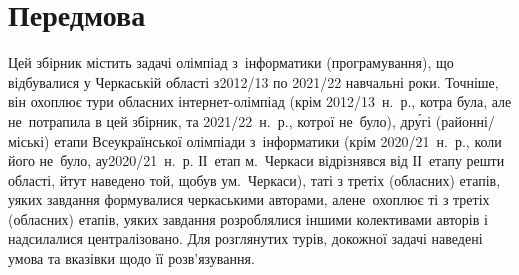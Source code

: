 \section{Передмова}

\hspace*{\parindent}Цей збірник містить задачі олімпіад з~інформатики (програмування), що відбувалися у Черкаській області з\nolinebreak[2] \mbox{2012/13} по \mbox{2021/22} навчальні роки. Точніше, він охоплює тури обласних інтернет-олімпіад (крім 2012/13~н.~р., котра була, але не~потрапила в цей збірник, та 2021/22~н.~р., котрої не~було), др\'{у}гі (районні/\linebreak[1]міські) етапи Всеукраїнської олімпіади з~інформатики (крім 2020/21~н.~р., коли його не~було, а\nolinebreak[2] у\nolinebreak[2] \mbox{2020/21}~н.~р. ІІ~етап м.~Черкаси відрізнявся від ІІ~етапу решти області, й\nolinebreak[3] тут наведено той, що\nolinebreak[2] був у\nolinebreak[3] м.~Черкаси), та\nolinebreak[2] ті з третіх (обласних) етапів, у\nolinebreak[3] яких завдання формувалися черкаськими авторами, але\nolinebreak[2] не~охоплює ті з третіх (обласних) етапів, у\nolinebreak[3] яких завдання розроблялися іншими колективами авторів і надсилалися централізовано. Для розглянутих турів, до\nolinebreak[3] кожної задачі наведені умова та вказівки щодо її розв'язування.

